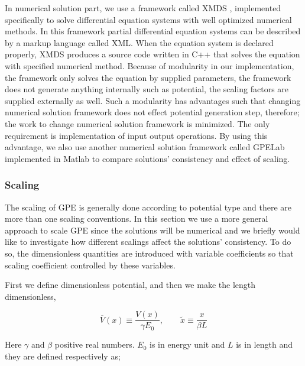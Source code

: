 \documentclass[a4paper,times,hidelinks,12pt]{article}
\begin{document}
In numerical solution part, we use a framework called XMDS \cite{dennis2013xmds2}, implemented specifically to solve differential equation systems with well optimized numerical methods. In this framework partial differential equation systems can be described by a markup language called XML.  When the equation system is declared properly, XMDS produces a source code written in C++ that solves the equation with specified numerical method. Because of modularity in our implementation, the framework only solves the equation by supplied parameters, the framework does not generate anything internally such as potential, the scaling factors are supplied externally as well. Such a modularity has advantages such that changing numerical solution framework does not effect potential generation step, therefore; the work to change numerical solution framework is minimized. The only requirement is implementation of input output operations. By using this advantage, we also use another numerical solution framework called GPELab \cite{antoine2014gpelab} implemented in Matlab to compare solutions' consistency and effect of scaling.


\subsubsection{Scaling}

The scaling of GPE is generally done according to potential type and there are more than one scaling conventions. In this section we use a more general approach to scale GPE since the solutions will be numerical and we briefly would like to investigate how different scalings affect the solutions' consistency. To do so, the dimensionless quantities are introduced with variable coefficients so that scaling coefficient controlled by these variables. 

First we define dimensionless potential, and then we make the length dimensionless,



$$ \overline{V}(x) \equiv \frac{V(x)}{\gamma E_0}, \qquad \widetilde{x} \equiv \frac{x}{\beta L} $$

\noindent Here $\gamma$ and $\beta$ positive real numbers. $E_0$ is in energy unit and $L$ is in length and they are defined respectively as;
\end{document}
